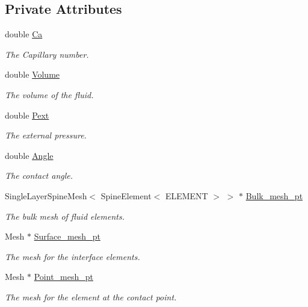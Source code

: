 \subsection*{Private Attributes}
\begin{DoxyCompactItemize}
\item 
double \hyperlink{classCapProblem_ad856df0aa70d881a2b2bc81ad4e2e251}{Ca}
\begin{DoxyCompactList}\small\item\em The Capillary number. \end{DoxyCompactList}\item 
double \hyperlink{classCapProblem_ab1f403fd3be7648c3a52a66684a78f7e}{Volume}
\begin{DoxyCompactList}\small\item\em The volume of the fluid. \end{DoxyCompactList}\item 
double \hyperlink{classCapProblem_a6fcc40a7331c00739923b49c167b396f}{Pext}
\begin{DoxyCompactList}\small\item\em The external pressure. \end{DoxyCompactList}\item 
double \hyperlink{classCapProblem_a7a57e45e3f1b7d30ae9d99bff56e8f5d}{Angle}
\begin{DoxyCompactList}\small\item\em The contact angle. \end{DoxyCompactList}\item 
Single\+Layer\+Spine\+Mesh$<$ Spine\+Element$<$ E\+L\+E\+M\+E\+NT $>$ $>$ $\ast$ \hyperlink{classCapProblem_a6d74594a707d89fc3fd5b87bf1c26a5b}{Bulk\+\_\+mesh\+\_\+pt}
\begin{DoxyCompactList}\small\item\em The bulk mesh of fluid elements. \end{DoxyCompactList}\item 
Mesh $\ast$ \hyperlink{classCapProblem_a1ebf7016d766c5de59d2a479e0733c69}{Surface\+\_\+mesh\+\_\+pt}
\begin{DoxyCompactList}\small\item\em The mesh for the interface elements. \end{DoxyCompactList}\item 
Mesh $\ast$ \hyperlink{classCapProblem_ac889ff4b3a1297ee3848ee78d549e914}{Point\+\_\+mesh\+\_\+pt}
\begin{DoxyCompactList}\small\item\em The mesh for the element at the contact point. \end{DoxyCompactList}\item 

\end{DoxyCompactItemize}
